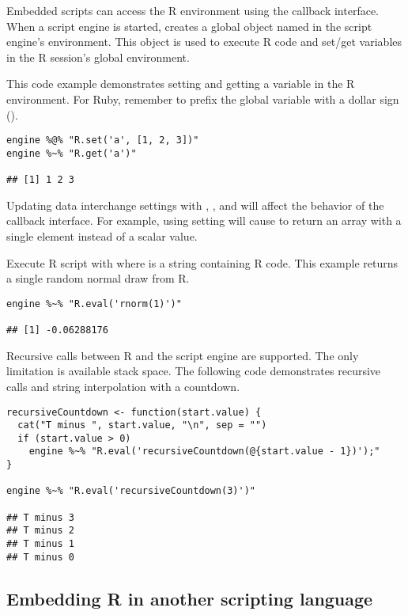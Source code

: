 Embedded scripts can access the R environment using the  callback interface. When a script engine is started,  creates a global object named  in the script engine's environment. This object is used to execute R code and set/get variables in the R session's global environment.

This code example demonstrates setting and getting a variable in the R environment. For Ruby, remember to prefix the global variable with a dollar sign ().

\begin{verbatim}
engine %@% "R.set('a', [1, 2, 3])"
engine %~% "R.get('a')"

## [1] 1 2 3
\end{verbatim}

 Updating data interchange settings with , , and  will affect the behavior of the callback interface. For example, using setting  will cause  to return an array with a single element instead of a scalar value.

Execute R script with  where  is a string containing R code. This example returns a single random normal draw from R.

\begin{verbatim}
engine %~% "R.eval('rnorm(1)')"

## [1] -0.06288176
\end{verbatim}

Recursive calls between R and the script engine are supported. The only limitation is available stack space. The following code demonstrates recursive calls and string interpolation with a countdown.

\begin{verbatim}
recursiveCountdown <- function(start.value) {
  cat("T minus ", start.value, "\n", sep = "")
  if (start.value > 0)
    engine %~% "R.eval('recursiveCountdown(@{start.value - 1})');"
}

engine %~% "R.eval('recursiveCountdown(3)')"

## T minus 3
## T minus 2
## T minus 1
## T minus 0
\end{verbatim}

\subsection{Embedding R in another scripting language}

